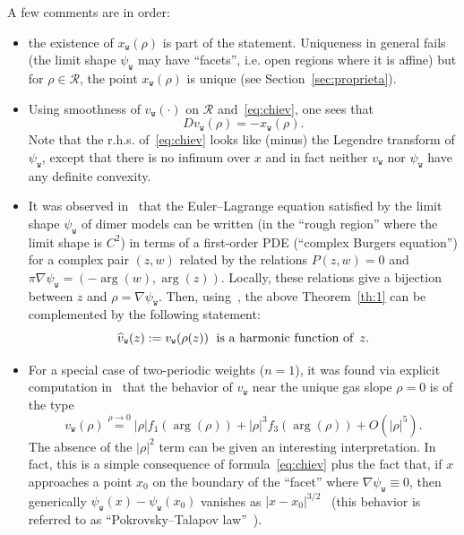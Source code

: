 \documentclass[10pt]{amsart}
\theoremstyle{definition}\newtheorem{defi}[theo]{Definition}\newtheorem{rema}[theo]{Remark}\newtheorem{exam}[theo]{Example}\newtheorem{exem}[theo]{Example}\newtheorem{nota}[theo]{Notation}
\newcommand{\ttw}{\mathtt{w}}
\newcommand{\clR}{\mathcal{R}}
\DeclareMathOperator{\argl}{arg}
\let\oldhat\hat
\renewcommand*{\hat}[1]{\mathchoice{\widehat{#1}}{\widehat{#1}}{\oldhat{#1}}{\oldhat{#1}}}
\begin{document}
A few comments are in order:
\begin{itemize}
\item the existence of $x_{\ttw}(\rho)$ is part of the statement. Uniqueness in general fails (the limit shape $\psi_{\ttw}$ may have ``facets'', i.e. open regions where it is affine) but for $\rho\in\clR$, the point $x_{\ttw}(\rho)$ is unique (see Section~\ref{sec:proprieta}).
\item Using smoothness of $v_{\ttw}(\cdot)$ on $\clR$ and~\eqref{eq:chiev}, one sees that
\begin{equation}\label{eq:chieDv}
D v_{\ttw}(\rho)=-x_{\ttw}(\rho).
\end{equation}
Note that the r.h.s. of~\eqref{eq:chiev} looks like (minus) the Legendre transform of $\psi_{\ttw}$, except that there is no infimum over $x$ and in fact neither $v_{\ttw}$ nor $\psi_{\ttw}$ have any definite convexity.
\item It was observed in~\cite{KO07} that the Euler--Lagrange equation satisfied by the limit shape $\psi_{\ttw}$ of dimer models can be written (in the ``rough region'' where the limit shape is $C^2$) in terms of a first-order PDE (``complex Burgers equation'') for a complex pair $(z,w)$ related by the relations $P(z,w)=0$ and $\pi\nabla \psi_{\ttw}=(-\argl(w),\argl(z))$. Locally, these relations give a bijection between $z$ and $\rho=\nabla\psi_{\ttw}$. Then, using~\cite[Section~3]{borodin2018two}, the above Theorem~\ref{th:1} can be complemented by the following statement:
\[
\hat v_{\ttw}(z):=v_{\ttw}(\rho(z))\; \text{ is a harmonic function of } \, z.
\]
\item For a special case of two-periodic weights ($n=1$), it was found via explicit computation in~\cite[Theorem~3.11]{CT:18} that the behavior of $v_{\ttw}$ near the unique gas slope $\rho=0$ is of the type
\begin{equation}
v_{\ttw}(\rho)\stackrel{\rho\to0}=|\rho|f_1(\argl(\rho))+|\rho|^3f_3\left(\argl(\rho)\right)+O\left(|\rho|^5\right).
\end{equation}
The absence of the $|\rho|^2$ term can be given an interesting interpretation. In fact, this is a simple consequence of formula~\eqref{eq:chiev} plus the fact that, if $x$ approaches a point $x_0$ on the boundary of the ``facet'' where $\nabla\psi_{\ttw}\equiv 0$, then generically $\psi_{\ttw}(x)-\psi_{\ttw}(x_0)$ vanishes as $|x-x_0|^{3/2}$~\cite{KO07} (this behavior is referred to as ``Pokrovsky--Talapov law''~\cite{pokrovskii1980theory}).
\end{itemize}
\end{document}
